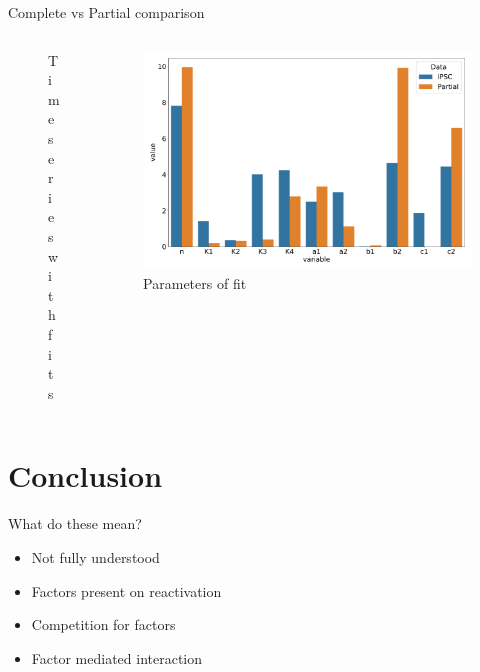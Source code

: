 \documentclass[aspectratio=169,9pt]{beamer}
\begin{document}
\begin{frame}{Complete vs Partial comparison}
\begin{columns}
\begin{column}{0.75\textwidth}
\begin{figure}[h]
\begin{subfigure}[b]{0.49\textwidth}
                    \end{subfigure}
                    \caption{Timeseries with fits}
                \end{figure}
            \end{column}
            \pause
            \begin{column}{0.35\textwidth}
                \begin{figure}[h]
                    \centering
                    \includegraphics[width=\textwidth]{IIII_timeshifted-parmcomp}
                    \caption{Parameters of fit}
                \end{figure}
            \end{column}
        \end{columns}
    \end{frame}

    \section{Conclusion}
    \begin{frame}{What do these mean?}
        \begin{itemize}
            \item Not fully understood
            \item Factors present on reactivation
            \item Competition for factors
            \item Factor mediated interaction
        \end{itemize}
    \end{frame}
    
\end{document}

